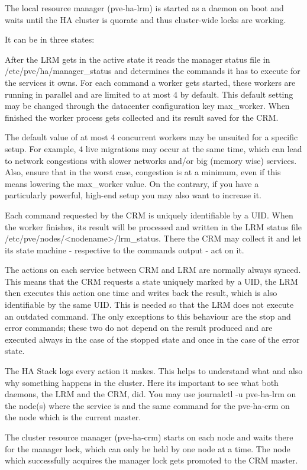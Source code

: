 The local resource manager (pve-ha-lrm) is started as a daemon on boot and waits until the HA cluster is quorate and thus cluster-wide locks are working.

It can be in three states:

After the LRM gets in the active state it reads the manager status file in /etc/pve/ha/manager_status and determines the commands it has to execute for the services it owns. For each command a worker gets started, these workers are running in parallel and are limited to at most 4 by default. This default setting may be changed through the datacenter configuration key max_worker. When finished the worker process gets collected and its result saved for the CRM.

The default value of at most 4 concurrent workers may be unsuited for a specific setup. For example, 4 live migrations may occur at the same time, which can lead to network congestions with slower networks and/or big (memory wise) services. Also, ensure that in the worst case, congestion is at a minimum, even if this means lowering the max_worker value. On the contrary, if you have a particularly powerful, high-end setup you may also want to increase it.

Each command requested by the CRM is uniquely identifiable by a UID. When the worker finishes, its result will be processed and written in the LRM status file /etc/pve/nodes/<nodename>/lrm_status. There the CRM may collect it and let its state machine - respective to the commands output - act on it.

The actions on each service between CRM and LRM are normally always synced. This means that the CRM requests a state uniquely marked by a UID, the LRM then executes this action one time and writes back the result, which is also identifiable by the same UID. This is needed so that the LRM does not execute an outdated command. The only exceptions to this behaviour are the stop and error commands; these two do not depend on the result produced and are executed always in the case of the stopped state and once in the case of the error state.

The HA Stack logs every action it makes. This helps to understand what and also why something happens in the cluster. Here its important to see what both daemons, the LRM and the CRM, did. You may use journalctl -u pve-ha-lrm on the node(s) where the service is and the same command for the pve-ha-crm on the node which is the current master.

The cluster resource manager (pve-ha-crm) starts on each node and waits there for the manager lock, which can only be held by one node at a time. The node which successfully acquires the manager lock gets promoted to the CRM master.

